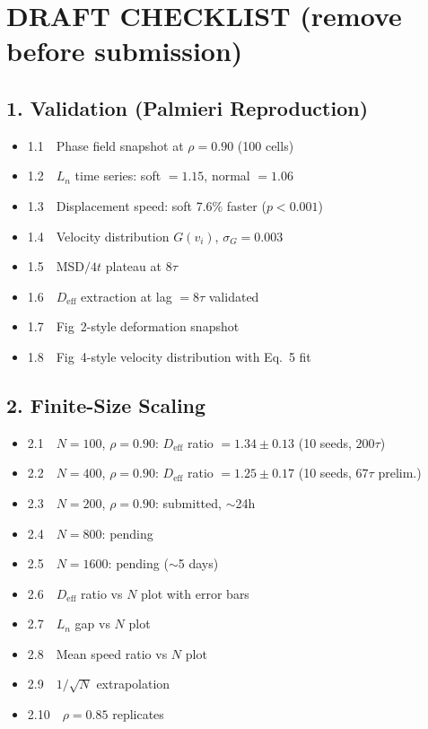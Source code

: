 \documentclass[aps,pre,twocolumn,superscriptaddress,longbibliography,floatfix]{revtex4-2}
\newcommand{\Deff}{D_{\mathrm{eff}}}       %
\begin{document}
\onecolumngrid
\begingroup
\small
\color{red}
\section*{DRAFT CHECKLIST (remove before submission)}

\subsection*{1. Validation (Palmieri Reproduction)}
\begin{itemize}
\item[$\checkmark$] 1.1~~Phase field snapshot at $\rho=0.90$ (100 cells)
\item[$\checkmark$] 1.2~~$L_n$ time series: soft $=1.15$, normal $=1.06$
\item[$\checkmark$] 1.3~~Displacement speed: soft 7.6\% faster ($p<0.001$)
\item[$\checkmark$] 1.4~~Velocity distribution $G(v_i)$, $\sigma_G=0.003$
\item[$\checkmark$] 1.5~~MSD$/4t$ plateau at $8\tau$
\item[$\checkmark$] 1.6~~$\Deff$ extraction at lag $= 8\tau$ validated
\item[$\square$] 1.7~~Fig~2-style deformation snapshot
\item[$\square$] 1.8~~Fig~4-style velocity distribution with Eq.~5 fit
\end{itemize}

\subsection*{2. Finite-Size Scaling}
\begin{itemize}
\item[$\checkmark$] 2.1~~$N=100$, $\rho=0.90$: $\Deff$ ratio $= 1.34 \pm 0.13$ (10 seeds, $200\tau$)
\item[$\sim$] 2.2~~$N=400$, $\rho=0.90$: $\Deff$ ratio $= 1.25 \pm 0.17$ (10 seeds, $67\tau$ prelim.)
\item[$\sim$] 2.3~~$N=200$, $\rho=0.90$: submitted, $\sim$24h
\item[$\square$] 2.4~~$N=800$: pending
\item[$\square$] 2.5~~$N=1600$: pending ($\sim$5 days)
\item[$\square$] 2.6~~$\Deff$ ratio vs $N$ plot with error bars
\item[$\square$] 2.7~~$L_n$ gap vs $N$ plot
\item[$\square$] 2.8~~Mean speed ratio vs $N$ plot
\item[$\square$] 2.9~~$1/\sqrt{N}$ extrapolation
\item[$\square$] 2.10~~$\rho=0.85$ replicates
\end{itemize}
\end{document}
